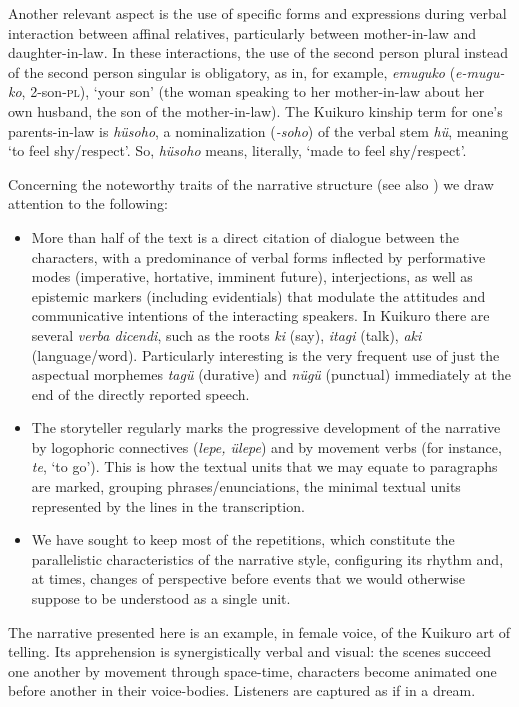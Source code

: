 \documentclass[output=paper,
modfonts,nonflat
]{langsci/langscibook}
\begin{document}
	Another relevant aspect is the use of specific forms and expressions during verbal interaction between affinal relatives, particularly between mother-in-law and daughter-in-law. In these interactions, the use of the second person plural instead of the second person singular is obligatory, as in, for example, \emph{emuguko} (\emph{e-mugu-ko}, 2-son-\textsc{pl}), `your son’ (the woman speaking to her mother-in-law about her own husband, the son of the mother-in-law). The Kuikuro kinship term for one's parents-in-law is \emph{hüsoho}, a nominalization (\emph{-soho}) of the verbal stem \emph{hü},  meaning `to feel shy/respect'. So, \emph{hüsoho} means, literally, `made to feel shy/respect'.

	Concerning the noteworthy traits of the narrative structure (see also \citealt{Basso1985,Franchetto2003}) we draw attention to the following:

\begin{itemize}
\item More than half of the text is a direct citation of dialogue between the characters, with a predominance of verbal forms inflected by performative modes (imperative, hortative, imminent future), interjections, as well as epistemic markers (including evidentials) that modulate the attitudes and communicative intentions of the interacting speakers. 
In Kuikuro there are several \emph{verba dicendi}, such as the roots \emph{ki} (say), \emph{itagi} (talk), \emph{aki} (language/word). Particularly interesting is the very frequent use of just the aspectual morphemes \emph{tagü} (durative) and \emph{nügü} (punctual) immediately at the end of the directly reported speech.
\item The storyteller regularly marks the progressive development of the narrative by logophoric connectives (\emph{lepe, ülepe}) and by movement verbs (for instance, \emph{te}, ‘to go’). This is how the textual units that we may equate to paragraphs are marked, grouping phrases/enunciations, the minimal textual units represented by the lines in the transcription. 
\item We have sought to keep most of the repetitions, which constitute the parallelistic characteristics of the narrative style, configuring its rhythm and, at times, changes of perspective before events that we would otherwise suppose to be understood as a single unit.
\end{itemize}
 

The narrative presented here is an example, in female voice, of the Kuikuro art of telling. Its apprehension is synergistically verbal and visual: the scenes succeed one another by movement through space-time, characters become animated one before another in their voice-bodies. Listeners are captured as if in a dream.
\end{document}
